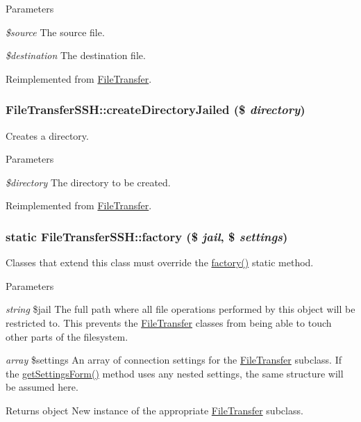 \begin{DoxyParams}{Parameters}
\item[{\em \$source}]The source file. \item[{\em \$destination}]The destination file. \end{DoxyParams}


Reimplemented from \hyperlink{classFileTransfer_a9ca65dc0107476d044cf18c0873f4a90}{FileTransfer}.\hypertarget{classFileTransferSSH_a4a36f6ce422bebc58aca5fe3b8a00d06}{
\subsubsection[{createDirectoryJailed}]{\setlength{\rightskip}{0pt plus 5cm}FileTransferSSH::createDirectoryJailed (\$ {\em directory})}}
\label{classFileTransferSSH_a4a36f6ce422bebc58aca5fe3b8a00d06}
Creates a directory.


\begin{DoxyParams}{Parameters}
\item[{\em \$directory}]The directory to be created. \end{DoxyParams}


Reimplemented from \hyperlink{classFileTransfer_a585c6cfab189aabbee70a624a50af975}{FileTransfer}.\hypertarget{classFileTransferSSH_afafbb0a5ffc2799cd926f38b87ea5e41}{
\subsubsection[{factory}]{\setlength{\rightskip}{0pt plus 5cm}static FileTransferSSH::factory (\$ {\em jail}, \/  \$ {\em settings})}}
\label{classFileTransferSSH_afafbb0a5ffc2799cd926f38b87ea5e41}
Classes that extend this class must override the \hyperlink{classFileTransferSSH_afafbb0a5ffc2799cd926f38b87ea5e41}{factory()} static method.


\begin{DoxyParams}{Parameters}
\item[{\em string}]\$jail The full path where all file operations performed by this object will be restricted to. This prevents the \hyperlink{classFileTransfer}{FileTransfer} classes from being able to touch other parts of the filesystem. \item[{\em array}]\$settings An array of connection settings for the \hyperlink{classFileTransfer}{FileTransfer} subclass. If the \hyperlink{classFileTransferSSH_a56142f1f2a4e513a727fb4cc2a029e74}{getSettingsForm()} method uses any nested settings, the same structure will be assumed here. \end{DoxyParams}
\begin{DoxyReturn}{Returns}
object New instance of the appropriate \hyperlink{classFileTransfer}{FileTransfer} subclass. 
\end{DoxyReturn}


